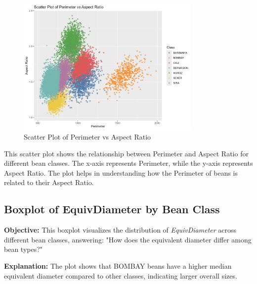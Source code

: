 \documentclass[a4paper,12pt]{article}
\begin{document}
\begin{figure}[H]
    \centering
    \includegraphics[width=0.8\textwidth]{graphs/scatter_perimeter_aspectratio.png}
    \caption{Scatter Plot of Perimeter vs Aspect Ratio}
    \label{fig:scatter_perimeter_aspect}
\end{figure}
This scatter plot shows the relationship between Perimeter and Aspect Ratio for different bean classes. The x-axis represents Perimeter, while the y-axis represents Aspect Ratio. The plot helps in understanding how the Perimeter of beans is related to their Aspect Ratio.

\newpage

\subsection{Boxplot of EquivDiameter by Bean Class}
\noindent\textbf{Objective:} This boxplot visualizes the distribution of \textit{EquivDiameter} across different bean classes, answering: "How does the equivalent diameter differ among bean types?"

\noindent\textbf{Explanation:} The plot shows that BOMBAY beans have a higher median equivalent diameter compared to other classes, indicating larger overall sizes.
\end{document}
